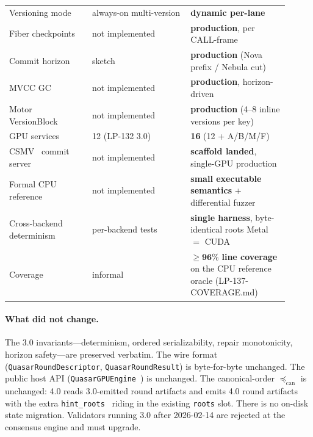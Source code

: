 \begin{table}[ht]
\begin{tabular}{p{0.27\linewidth}p{0.32\linewidth}p{0.32\linewidth}}
Versioning mode & always-on multi-version & \textbf{dynamic per-lane}~\cite{multiverse2026} \\
Fiber checkpoints & not implemented & \textbf{production}, per CALL-frame \\
Commit horizon & sketch & \textbf{production} (Nova prefix / Nebula cut) \\
MVCC GC & not implemented & \textbf{production}, horizon-driven \\
Motor VersionBlock~\cite{motor2024} & not implemented & \textbf{production} (4--8 inline versions per key) \\
GPU services & 12 (LP-132 3.0) & \textbf{16} (12 + A/B/M/F) \\
CSMV~\cite{csmv} commit server & not implemented & \textbf{scaffold landed}, single-GPU production \\
Formal CPU reference~\cite{vmvcc} & not implemented & \textbf{small executable semantics} + differential fuzzer \\
Cross-backend determinism & per-backend tests & \textbf{single harness}, byte-identical roots Metal $=$ CUDA \\
Coverage & informal & $\mathbf{\geq 96\%}$ \textbf{line coverage} on the CPU reference oracle (LP-137-COVERAGE.md) \\
\bottomrule
\end{tabular}
\end{table}

\paragraph{What did not change.}
The 3.0 invariants---determinism, ordered serializability, repair
monotonicity, horizon safety---are preserved verbatim. The wire format
(\texttt{QuasarRoundDescriptor}, \texttt{QuasarRoundResult}) is
byte-for-byte unchanged. The public host API
(\texttt{QuasarGPUEngine}~\cite{lp132-quasarexec}) is unchanged. The
canonical-order $\preceq_{\mathrm{can}}$ is unchanged: 4.0 reads
3.0-emitted round artifacts and emits 4.0 round artifacts with the
extra \texttt{hint\_roots}~\cite{chiron2025} riding in the existing
\texttt{roots} slot. There is no on-disk state migration. Validators
running 3.0 after 2026-02-14 are rejected at the consensus engine and
must upgrade.

